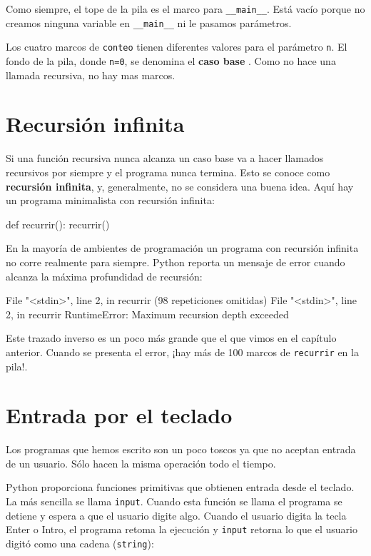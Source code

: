 Como siempre, el tope de la pila es el marco para \texttt{\_\_main\_\_}.
Está vacío porque no creamos ninguna variable en \texttt{\_\_main\_\_}
ni le pasamos parámetros.

Los cuatro marcos de \texttt{conteo} tienen diferentes valores para
el parámetro \texttt{n}. El fondo de la pila, donde \texttt{n=0},
se denomina el \textbf{caso base }. Como no hace una llamada recursiva,
no hay mas marcos.

 

\section{Recursión infinita}

  
 

Si una función recursiva nunca alcanza un caso base va a hacer llamados
recursivos por siempre y el programa nunca termina. Esto se conoce
como \textbf{recursión infinita}, y, generalmente, no se considera
una buena idea. Aquí hay un programa minimalista con recursión infinita:

\begin{pythoncode}
def recurrir():
  recurrir()
\end{pythoncode}
 En la mayoría de ambientes de programación un programa con recursión
infinita no corre realmente para siempre. Python reporta un mensaje
de error cuando alcanza la máxima profundidad de recursión:
\begin{pythoncode}
  File "<stdin>", line 2, in recurrir
  (98 repeticiones omitidas)
  File "<stdin>", line 2, in recurrir
RuntimeError: Maximum recursion depth exceeded
\end{pythoncode}
Este trazado inverso es un poco más grande que el que vimos en el
capítulo anterior. Cuando se presenta el error, ¡hay más de 100 marcos
de \texttt{recurrir} en la pila!.

\section{Entrada por el teclado}

Los programas que hemos escrito son un poco toscos ya que no aceptan
entrada de un usuario. Sólo hacen la misma operación todo el tiempo.

Python proporciona funciones primitivas que obtienen entrada desde
el teclado. La más sencilla se llama \texttt{input}. Cuando esta
función se llama el programa se detiene y espera a que el usuario
digite algo. Cuando el usuario digita la tecla Enter o Intro, el programa
retoma la ejecución y \texttt{input} retorna lo que el usuario
digitó como una cadena (\texttt{string}):

